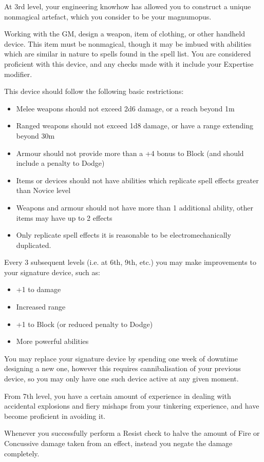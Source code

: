 {
	At 3rd level, your engineering know\minus{}how has allowed you to construct a unique non\minus{}magical artefact, which you consider to be your magnum\minus{}opus. 
	
	Working with the GM, design a weapon, item of clothing, or other hand\minus{}held device. This item must be non\minus{}magical, though it may be imbued with abilities which are similar in nature to spells found in the spell list. You are considered proficient with this device, and any checks made with it include your Expertise modifier. 
	
	This device should follow the following basic restrictions:
	\begin{itemize}
		\item Melee weapons should not exceed 2d6 damage, or a reach beyond 1m
		\item Ranged weapons should not exceed 1d8 damage, or have a range extending beyond 30m
		\item Armour should not provide more than a +4 bonus to Block (and should include a penalty to Dodge)
		\item Items or devices should not have abilities which replicate spell effects greater than Novice level
		\item Weapons and armour should not have more than 1 additional ability, other items may have up to 2 effects
		\item Only replicate spell effects it is reasonable to be electromechanically duplicated.
	\end{itemize}
	
	Every 3 subsequent levels (i.e. at 6th, 9th, etc.) you may make improvements to your signature device, such as:
	\begin{itemize}
		\item +1 to damage
		\item Increased range
		\item +1 to Block (or reduced penalty to Dodge)
		\item More powerful abilities
	\end{itemize}
	
	You may replace your signature device by spending one week of downtime designing a new one, however this requires cannibalisation of your previous device, so you may only have one such device active at any given moment.
}

{
	From 7th level, you have a certain amount of experience in dealing with accidental explosions and fiery mishaps from your tinkering experience, and have become proficient in avoiding it.
	
	Whenever you successfully perform a Resist check to halve the amount of Fire or Concussive damage taken from an effect, instead you negate the damage completely.
}

